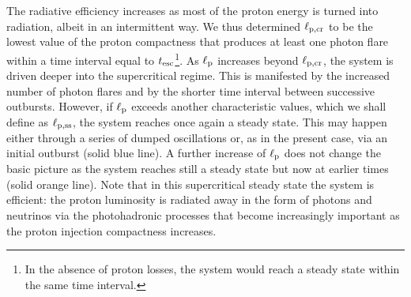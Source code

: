 \documentclass[fleqn,usenatbib]{mnras}
\newcommand{\tesc}{t_{\rm esc}}
\newcommand{\lp}{\ell_{\rm p}}
\newcommand{\lpcrss}{\ell_{\rm p, ss}}
\newcommand{\lpcr}{\ell_{\rm p,cr}}
\begin{document}
{The radiative efficiency increases as most of the proton energy is turned into radiation, albeit in an
intermittent way. We thus determined $\lpcr$ to be the lowest value of the proton compactness
that produces at least one photon flare within a time interval equal to $\tesc$\footnote{In the absence of proton losses, the system would reach a steady state within the same time interval.}. As $\lp$ increases beyond $\lpcr$, the system is driven deeper into the supercritical regime. This is manifested by the increased number  of photon flares and by the shorter time interval between successive outbursts. However, if $\lp$ exceeds another characteristic values, which we shall define as $\lpcrss$,  the system reaches once again
a steady state. This may happen either through a series of dumped oscillations or, as in the
present case, via an initial outburst  (solid blue line). A further increase of $\lp$  does not change the
basic picture as the system reaches still a steady state but now at earlier times (solid orange line). Note that in this supercritical steady state 
the system is efficient: the proton luminosity is radiated away in the form of photons and neutrinos
via the photohadronic processes that become increasingly important as the proton injection compactness increases. 

}
\end{document}
